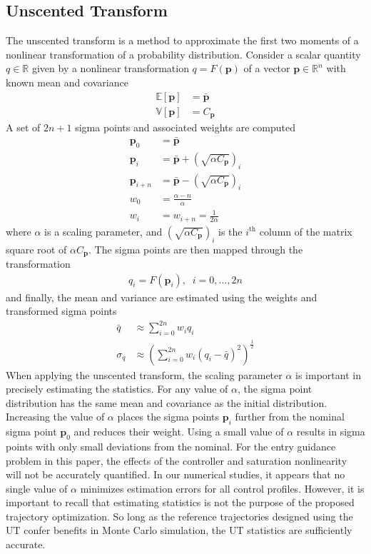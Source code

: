 \documentclass[journal ]{new-aiaa}
\newcommand{\param}{\ensuremath{\mathbf{p}}}
\newcommand{\E}[1]{\mathbb{E}\left[#1\right]}
\newcommand{\V}[1]{\mathbb{V}[#1]}
\newcommand{\cov}{C}
\begin{document}
\subsection*{Unscented Transform}
The unscented transform is a method to approximate the first two moments of a nonlinear transformation of a probability distribution. Consider a scalar quantity $q\in\mathbb{R}$ given by a nonlinear transformation $q = F(\param)$ of a vector $\param\in\mathbb{R}^n$ with known mean and covariance
\begin{align*}
\E{\param} &= \bar{\param}\\
\V{\param} &= \cov_{\param}
\end{align*}
A set of $2n+1$ sigma points and associated weights are computed 
\begin{align*}
\param_0 &= \bar{\param} \\
\param_i &=  \bar{\param} + \left(\sqrt{\alpha \cov_{\param}}\right)_i \\
\param_{i+n} &=  \bar{\param} - \left(\sqrt{\alpha\cov_{\param}}\right)_i \\
w_0 &= \frac{\alpha - n}{\alpha} \\
w_i &= w_{i+n} = \frac{1}{2\alpha}
\end{align*}
where $\alpha$ is a scaling parameter, and $\left(\sqrt{\alpha \cov_{\param}}\right)_i$ is the $i^{\mathrm{th}}$ column of the matrix square root of $\alpha \cov_{\param}$. The sigma points are then mapped through the transformation
\begin{align}
q_i = F(\param_i),\;\;i=0,...,2n
\end{align}
and finally, the mean and variance are estimated using the weights and transformed sigma points
\begin{align*}
\bar{q} &\approx \sum_{i=0}^{2n}w_iq_i\\
\sigma_{q} &\approx \left(\sum_{i=0}^{2n}w_i\left(q_i - \bar{q}\right)^2\right)^{\frac{1}{2}}
\end{align*}
When applying the unscented transform, the scaling parameter $\alpha$ is important in precisely estimating the statistics. For any value of $\alpha$, the sigma point distribution has the same mean and covariance as the initial distribution. Increasing the value of $\alpha$ places the sigma points $\param_i$ further from the nominal sigma point $\param_0$ and reduces their weight. Using a small value of $\alpha$ results in sigma points with only small deviations from the nominal. For the entry guidance problem in this paper, the effects of the controller and saturation nonlinearity will not be accurately quantified. In our numerical studies, it appears that no single value of $\alpha$ minimizes estimation errors for all control profiles. However, it is important to recall that estimating statistics is not the purpose of the proposed trajectory optimization. So long as the reference trajectories designed using the UT confer benefits in Monte Carlo simulation, the UT statistics are sufficiently accurate. 
\end{document}
